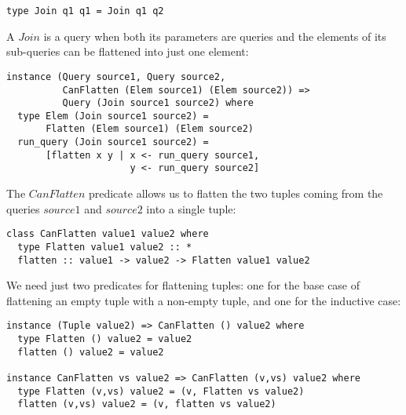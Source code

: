 \begin{lstlisting}
type Join q1 q1 = Join q1 q2
\end{lstlisting}

A $Join$ is a query when both its parameters are queries and the elements of its sub-queries can be flattened into just one element:
\begin{lstlisting}
instance (Query source1, Query source2, 
          CanFlatten (Elem source1) (Elem source2)) => 
          Query (Join source1 source2) where
  type Elem (Join source1 source2) = 
       Flatten (Elem source1) (Elem source2)
  run_query (Join source1 source2) = 
       [flatten x y | x <- run_query source1, 
                      y <- run_query source2]
\end{lstlisting}

The $CanFlatten$ predicate allows us to flatten the two tuples coming from the queries $source1$ and $source2$ into a single tuple:
\begin{lstlisting}
class CanFlatten value1 value2 where
  type Flatten value1 value2 :: *
  flatten :: value1 -> value2 -> Flatten value1 value2
\end{lstlisting}

We need just two predicates for flattening tuples: one for the base case of flattening an empty tuple with a non-empty tuple, and one for the inductive case:
\begin{lstlisting}
instance (Tuple value2) => CanFlatten () value2 where
  type Flatten () value2 = value2
  flatten () value2 = value2

instance CanFlatten vs value2 => CanFlatten (v,vs) value2 where
  type Flatten (v,vs) value2 = (v, Flatten vs value2)
  flatten (v,vs) value2 = (v, flatten vs value2)
\end{lstlisting}

